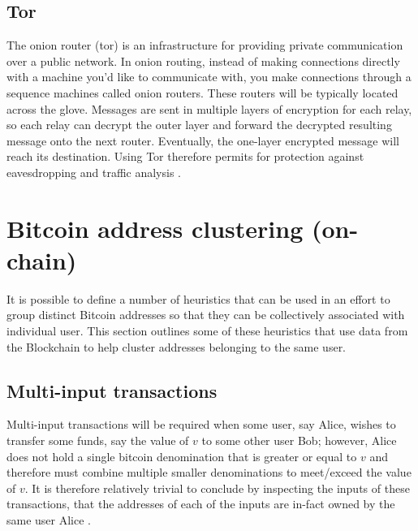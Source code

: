 \subsection{Tor}
The onion router (tor) is an infrastructure for providing private communication over a public network. In onion routing, instead of making connections directly with a machine you'd like to communicate with, you make connections through a sequence machines called onion routers. These routers will be typically located across the glove. Messages are sent in multiple layers of encryption for each relay, so each relay can decrypt the outer layer and forward the decrypted resulting message onto the next router. Eventually, the one-layer encrypted message will reach its destination. Using Tor therefore permits for protection against eavesdropping and traffic analysis \cite{RefWorks:doc:5c3e103be4b014f3944e4192}.

\section{Bitcoin address clustering (on-chain)}\label{background:clustering}

It is possible to define a number of heuristics that can be used in an effort to group distinct Bitcoin addresses so that they can be collectively associated with individual user. This section outlines some of these heuristics that use data from the Blockchain to help cluster addresses belonging to the same user.

\subsection{Multi-input transactions}\label{background:multi-input-tx}
Multi-input transactions will be required when some user, say Alice, wishes to transfer some funds, say the value of $v$ to some other user Bob; however, Alice does not hold a single bitcoin denomination that is greater or equal to $v$ and therefore must combine multiple smaller denominations to meet/exceed the value of $v$. It is therefore relatively trivial to conclude by inspecting the inputs of these transactions, that the addresses of each of the inputs are in-fact owned by the same user Alice \cite{RefWorks:doc:5c3de14be4b042abd3bcc2c6}.

